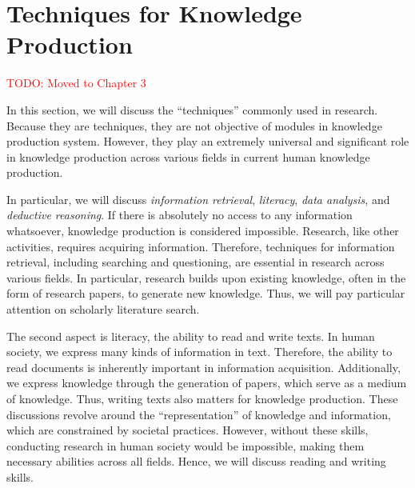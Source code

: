 


\section{Techniques for Knowledge Production}
\textcolor{red}{TODO: Moved to Chapter 3}

In this section, we will discuss the ``techniques'' commonly used in research. Because they are techniques, they are not objective of modules in knowledge production system. However, they play an extremely universal and significant role in knowledge production across various fields in current human knowledge production. 

In particular, we will discuss \textit{information retrieval}, \textit{literacy}, \textit{data analysis}, and \textit{deductive reasoning}. If there is absolutely no access to any information whatsoever, knowledge production is considered impossible. Research, like other activities, requires acquiring information. Therefore, techniques for information retrieval, including searching and questioning, are essential in research across various fields. In particular, research builds upon existing knowledge, often in the form of research papers, to generate new knowledge. Thus, we will pay particular attention on scholarly literature search. 

The second aspect is literacy, the ability to read and write texts. In human society, we express many kinds of information in text. Therefore, the ability to read documents is inherently important in information acquisition. Additionally, we express knowledge through the generation of papers, which serve as a medium of knowledge. Thus, writing texts also matters for knowledge production. These discussions revolve around the ``representation'' of knowledge and information, which are constrained by societal practices. However, without these skills, conducting research in human society would be impossible, making them necessary abilities across all fields. Hence, we will discuss reading and writing skills. 

